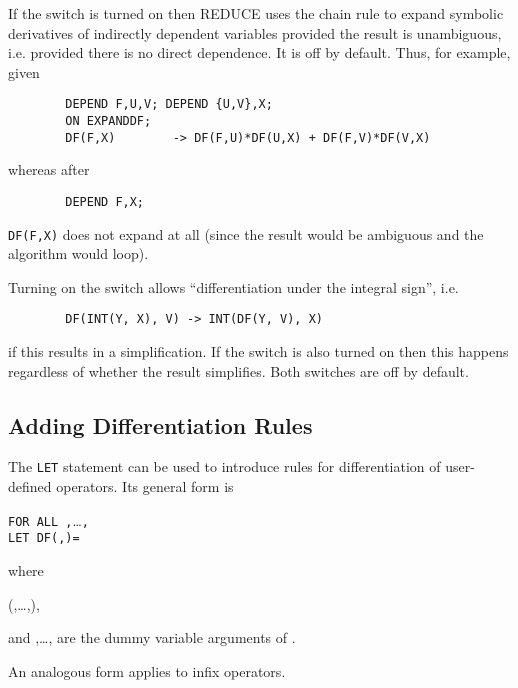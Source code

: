 \hypertarget{switch:EXPANDDF}{}
If the switch  is turned on then REDUCE uses
the chain rule to expand symbolic derivatives of indirectly dependent variables
provided the result is unambiguous, i.e. provided there is no direct dependence.
It is off by default.  Thus, for example, given
\newpage
\begin{verbatim}
        DEPEND F,U,V; DEPEND {U,V},X;
        ON EXPANDDF;
        DF(F,X)        -> DF(F,U)*DF(U,X) + DF(F,V)*DF(V,X)
\end{verbatim}
whereas after
\begin{verbatim}
        DEPEND F,X;
\end{verbatim}
\texttt{DF(F,X)} does not expand at all (since the result would be ambiguous
and the algorithm would loop).

\hypertarget{switch:ALLOWDFINT}{}
\hypertarget{switch:DFINT}{}
Turning on the switch  allows
``differentiation under the integral sign'', i.e. 
\begin{verbatim}
        DF(INT(Y, X), V) -> INT(DF(Y, V), X)
\end{verbatim}
if this results in a simplification.  If the switch 
is also turned on then this happens regardless of whether the result
simplifies. Both switches are off by default.


\subsection{Adding Differentiation Rules}
\hypertarget{command:LETdf}{}

The \texttt{LET} statement can be used to introduce
rules for differentiation of user-defined operators.  Its general form is
\begin{syntaxtable}
 \texttt{FOR ALL }\texttt{,}\dots\texttt{,} \\
  \qquad \texttt{LET DF(}\texttt{,}\texttt{)=}
\end{syntaxtable}
where 
\begin{syntax}
  \bnfprod  (,\dots,),
\end{syntax}
and
,\ldots, are the dummy variable arguments of
.

An analogous form applies to infix operators.

